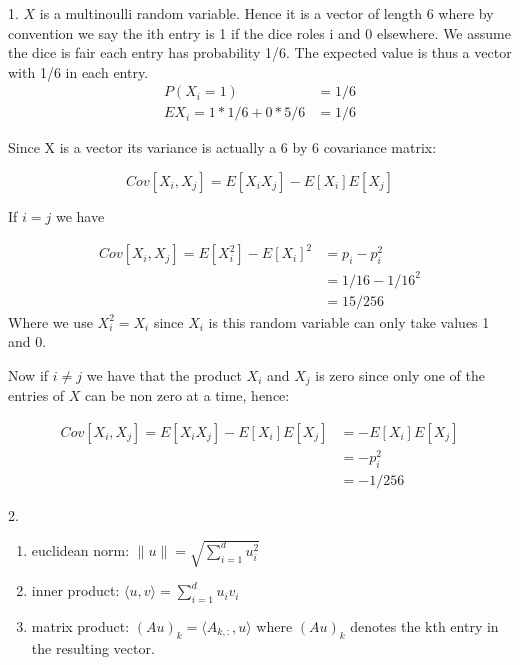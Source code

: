 \clearpage

1. $X$ is a multinoulli random variable. Hence it is a vector of 
length 6 where by convention we say the ith entry is 1 if the dice
roles i and 0 elsewhere. We assume the dice is fair each entry has
probability 1/6. The expected value is thus a vector with 1/6 in
each entry. 
\begin{align}
	P (X_i = 1) &= 1/6\\
	E X_i = 1*1/6 + 0*5/6 &= 1/6
\end{align}

Since X is a vector its variance is actually a 6 by 6 covariance matrix:

\begin{equation}
  Cov[X_i,X_j] = E[X_i X_j] - E[X_i]E[X_j]
\end{equation}

If $i=j$ we have

\begin{align}
  Cov [X_i ,X_j] = E[X_{i}^{2}] - {E[X_{i}]}^{2} &= p_{i}-p_{i}^{2}\\
                                               &= 1/16 - 1/16^2\\
                                               &= 15/256
\end{align}
Where we use $X_{i}^{2} = X_{i}$ since $X_{i}$ is this random variable can only take
values 1 and 0.

Now if $i \neq j$ we have that the product $X_{i}$ and $X_{j}$ is zero since
only one of the entries of $X$ can be non zero at a time, hence:

\begin{align}
  Cov [X_i ,X_j] = E[X_{i} X_{j}] - E[X_i] E[X_j] &= -E[X_i]E[X_j]\\
                                                  &= -p_i ^ 2 \\
                                                  &= -1/256
\end{align}


\clearpage

2.

\begin{enumerate}
  \item euclidean norm:
    $\| u \| =\sqrt{\sum_{i=1}^{d} u_{i}^{2}} $
  \item inner product:
    $\langle u, v \rangle = \sum_{i=1}^{d} u_{i}v_{i}$
  \item matrix product:
    $(Au)_k = \langle A_{k,:} , u \rangle $
    where $(Au)_k $ denotes the kth entry in the resulting vector.

\end{enumerate}

